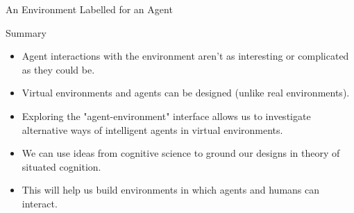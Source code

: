 \documentclass[aspectratio=1610,xcolor=dvipsnames,t]{beamer}
\begin{document}
\begin{frame}{An Environment Labelled for an Agent} 
\end{frame} 

\begin{frame}{Summary}
    \begin{itemize}
        \item Agent interactions with the environment aren't
              as interesting or complicated as they could be.
        \item Virtual environments and agents can be designed
              (unlike real environments).
        \item Exploring the "agent-environment" interface allows
              us to investigate alternative ways of intelligent
              agents in virtual environments.
        \item We can use ideas from cognitive science to  
              ground our designs in theory of situated cognition.
        \item This will help us build environments in which agents
              and humans can interact. 
    \end{itemize}
\end{frame} 
\end{document}
